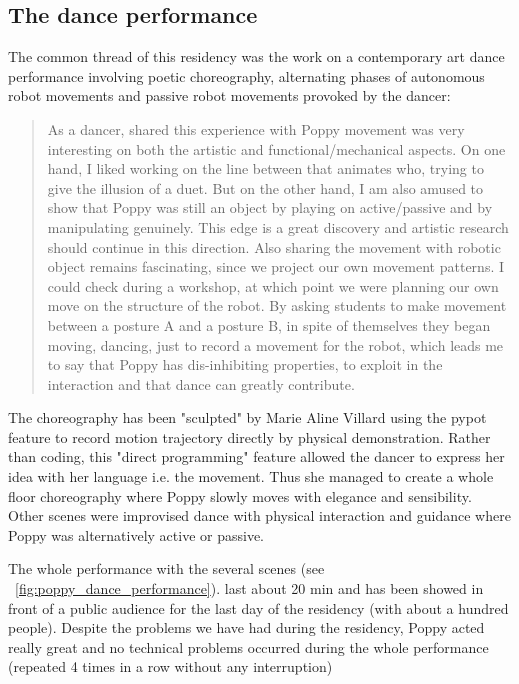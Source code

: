 \subsection{The dance performance} %

The common thread of this residency was the work on a contemporary art dance performance involving poetic choreography, alternating phases of autonomous robot movements and passive robot movements provoked by the dancer:

\begin{quotation}
    As a dancer, shared this experience with Poppy movement was very interesting on both the artistic and functional/mechanical aspects. On one hand, I liked working on the line between that animates who, trying to give the illusion of a duet. But on the other hand, I am also amused to show that Poppy was still an object by playing on active/passive and by manipulating genuinely. This edge is a great discovery and artistic research should continue in this direction.
    Also sharing the movement with robotic object remains fascinating, since we project our own movement patterns. I could check during a workshop, at which point we were planning our own move on the structure of the robot. By asking students to make movement between a posture A and a posture B, in spite of themselves they began moving, dancing, just to record a movement for the robot, which leads me to say that Poppy has dis-inhibiting properties, to exploit in the interaction and that dance can greatly contribute.

\end{quotation}

The choreography has been "sculpted" by Marie Aline Villard using the pypot feature to record motion trajectory directly by physical demonstration. Rather than coding, this "direct programming" feature allowed the dancer to express her idea with her language i.e. the movement. Thus she managed to create a whole floor choreography where Poppy slowly moves with elegance and sensibility.
Other scenes were improvised dance with physical interaction and guidance where Poppy was alternatively active or passive.

The whole performance with the several scenes (see \figurename~\ref{fig:poppy_dance_performance}). last about 20 min and has been showed in front of a public audience for the last day of the residency (with about a hundred people). Despite the problems we have had during the residency, Poppy acted really great and no technical problems occurred during the whole performance (repeated 4 times in a row without any interruption)

